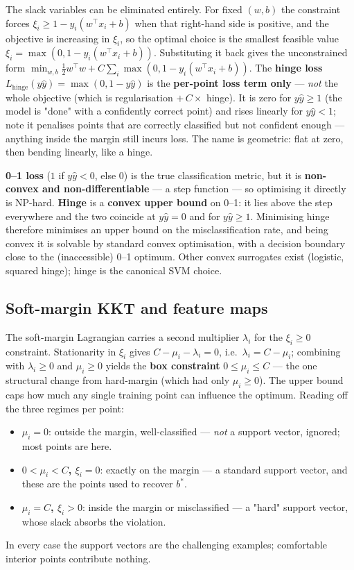 \documentclass[11pt, a4paper]{article}
\newcommand{\kw}[1]{\textbf{#1}}
\begin{document}
The slack variables can be eliminated entirely. For fixed $(w,b)$ the constraint forces
$\xi_i\ge1-y_i(w^\top x_i+b)$ when that right-hand side is positive, and the objective is increasing
in $\xi_i$, so the optimal choice is the smallest feasible value
$\xi_i=\max(0,1-y_i(w^\top x_i+b))$. Substituting it back gives the unconstrained form
$\min_{w,b}\tfrac12 w^\top w + C\sum_i\max(0,1-y_i(w^\top x_i+b))$. The \kw{hinge loss}
$L_{\text{hinge}}(y\hat y)=\max(0,1-y\hat y)$ is the \kw{per-point loss term only} — \emph{not} the
whole objective (which is regularisation $+\,C\times$ hinge). It is zero for $y\hat y\ge1$ (the
model is "done" with a confidently correct point) and rises linearly for $y\hat y<1$; note it
penalises points that are correctly classified but not confident enough — anything inside the
margin still incurs loss. The name is geometric: flat at zero, then bending linearly, like a hinge.

\begin{trapbox}
\kw{0--1 loss} ($1$ if $y\hat y<0$, else $0$) is the true classification metric, but it is
\kw{non-convex and non-differentiable} — a step function — so optimising it directly is NP-hard.
\kw{Hinge} is a \kw{convex upper bound} on 0--1: it lies above the step everywhere and the two
coincide at $y\hat y=0$ and for $y\hat y\ge1$. Minimising hinge therefore minimises an upper bound
on the misclassification rate, and being convex it is solvable by standard convex optimisation, with
a decision boundary close to the (inaccessible) 0--1 optimum. Other convex surrogates exist
(logistic, squared hinge); hinge is the canonical SVM choice.
\end{trapbox}

\subsection{Soft-margin KKT and feature maps}

The soft-margin Lagrangian carries a second multiplier $\lambda_i$ for the $\xi_i\ge0$ constraint.
Stationarity in $\xi_i$ gives $C-\mu_i-\lambda_i=0$, i.e.\ $\lambda_i=C-\mu_i$; combining with
$\lambda_i\ge0$ and $\mu_i\ge0$ yields the \kw{box constraint} $0\le\mu_i\le C$ — the one structural
change from hard-margin (which had only $\mu_i\ge0$). The upper bound caps how much any single
training point can influence the optimum. Reading off the three regimes per point:
\begin{itemize}
  \item \kw{$\mu_i=0$}: outside the margin, well-classified — \emph{not} a support vector, ignored;
  most points are here.
  \item \kw{$0<\mu_i<C$, $\xi_i=0$}: exactly on the margin — a standard support vector, and these
  are the points used to recover $b^\ast$.
  \item \kw{$\mu_i=C$, $\xi_i>0$}: inside the margin or misclassified — a "hard" support vector,
  whose slack absorbs the violation.
\end{itemize}
In every case the support vectors are the challenging examples; comfortable interior points
contribute nothing.
\end{document}
